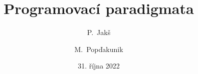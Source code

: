 \documentclass{beamer}
\title{Programovací paradigmata}
\author[Mat, Pav]{P.~Jakš \and M.~Popďakunik}
\institute[ČVUT-FJFI]{České vysoké učení technické, Fakulta jaderná a fyzikálně inženýrská}
\date{31. října 2022}
\begin{document}
\frame{\titlepage}













\end{document}
